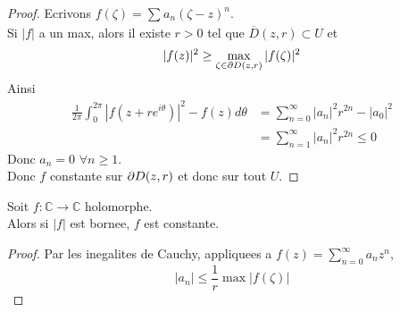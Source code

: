 \documentclass[../main.tex]{subfiles}
\begin{document}
\begin{proof}
	Ecrivons $f( \zeta) = \sum_{}^{ } a_n ( \zeta-z) ^{n}$.\\
	Si $|f|$ a un max, alors il existe $r>0$ tel que $ \overline{D}( z,r) \subset U$ et
	\[ 
		|f( z) |^{2} \geq \max_{\zeta\in \partial D( z,r) } |f( \zeta) |^{2}
	\]
	Ainsi
	\begin{align*}
		\frac{1}{2\pi} \int_{ 0 }^{ 2\pi }|f( z+r e^{i\theta} ) |^{2}- f( z) d\theta &= \sum_{n=0}^{ \infty } |a_n|^{2} r^{2n} - |a_0|^{2}\\
		&= \sum_{n=1}^{ \infty } |a_n|^{2} r^{2n} \leq 0
	\end{align*}
Donc $a_n=0$ 	$\forall n \geq 1$.\\
Donc $f$ constante sur $\partial D( z,r) $ et donc sur tout $U$.
	
\end{proof}
\begin{thm}
	Soit $f: \mathbb{C}\to \mathbb{C}$ holomorphe.\\
	Alors si $|f|$ est bornee, $f$ est constante.
\end{thm}
\begin{proof}
	Par les inegalites de Cauchy, appliquees a $f( z)= \sum_{n=0}^{ \infty } a_n z^{n} $, 
	\[ 
		|a_n| \leq  \frac{1}{r}\max |f( \zeta) |
	\]
		
\end{proof}



		
\end{document}
